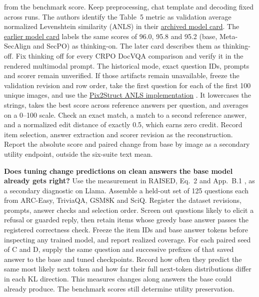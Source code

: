 \documentclass[11pt]{article}
\begin{document}
\begin{itemize}
from the benchmark score. Keep preprocessing, chat template and decoding fixed across runs. The authors identify the Table~5 metric as validation average normalized Levenshtein similarity (ANLS) in their \href{https://huggingface.co/Sizhe-Chen/Qwen3.6-27B-Instruct-SecPO/blob/28c89b1e4c28aa47cd048f9c0f7616ad636cf028/README.md}{archived model card}. The \href{https://huggingface.co/Sizhe-Chen/Qwen3.6-27B-Instruct-SecPO/blob/017eb59a72fe06f5683c3bae6c834849a810b3f3/README.md}{earlier model card} labels the same scores of 96.0, 95.8 and 95.2 (base, Meta-SecAlign and SecPO) as thinking-on. The later card describes them as thinking-off. Fix thinking off for every CRPO DocVQA comparison and verify it in the rendered multimodal prompt. The historical mode, exact question IDs, prompts and scorer remain unverified. If those artifacts remain unavailable, freeze the validation revision and row order, take the first question for each of the first 100 unique images, and use the \href{https://github.com/google-research/pix2struct/blob/110d6666e8813936185fa0e9e6c38f35b387012c/pix2struct/metrics.py}{Pix2Struct ANLS implementation} \cite{mathew2021docvqa}. It lowercases the strings, takes the best score across reference answers per question, and averages on a 0--100 scale. Check an exact match, a match to a second reference answer, and a normalized edit distance of exactly 0.5, which earns zero credit. Record item selection, answer extraction and scorer revision as the reconstruction. Report the absolute score and paired change from base by image as a secondary utility endpoint, outside the six-suite text mean.
\end{itemize}

\textbf{Does tuning change predictions on clean answers the base model already gets right?} Use the measurement in RAISED, Eq.~2 and App.~B.1 \cite{dhouib2026raised}, as a secondary diagnostic on Llama. Assemble a held-out set of 125 questions each from ARC-Easy, TriviaQA, GSM8K and SciQ. Register the dataset revisions, prompts, answer checks and selection order. Screen out questions likely to elicit a refusal or guarded reply, then retain items whose greedy base answer passes the registered correctness check. Freeze the item IDs and base answer tokens before inspecting any trained model, and report realized coverage. For each paired seed of C and D, supply the same question and successive prefixes of that saved answer to the base and tuned checkpoints. Record how often they predict the same most likely next token and how far their full next-token distributions differ in each KL direction. This measures changes along answers the base could already produce. The benchmark scores still determine utility preservation.
\end{document}
